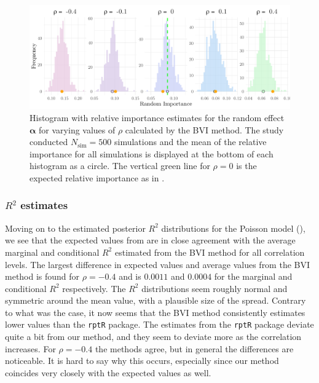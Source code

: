 \begin{figure}[H]
  \centering
    \includegraphics[width=1\linewidth]{Figures/Simulation study/Random_poisson.png}
    \caption[Relative importance of the random effect $\boldsymbol{\alpha}$ in Poisson GLMM]{Histogram with relative importance estimates for the random effect $\boldsymbol{\alpha}$ for varying values of $\rho$ calculated by the BVI method. The study conducted $N_{\text{sim}}=500$ simulations and the mean of the relative importance for all simulations is displayed at the bottom of each histogram as a circle. The vertical green line for $\rho=0$ is the expected relative importance as in .}
    \label{fig:relimp_random_poisson}
\end{figure}
\subsubsection{$R^2$ estimates}
Moving on to the estimated posterior $R^2$ distributions for the Poisson model (), we see that the expected values from  are in close agreement with the average marginal and conditional $R^2$ estimated from the BVI method for all correlation levels. The largest difference in expected values and average values from the BVI method is found for $\rho=-0.4$ and is $0.0011$ and $0.0004$ for the marginal and conditional $R^2$ respectively. The $R^2$ distributions seem roughly normal and symmetric around the mean value, with a plausible size of the spread. Contrary to what was the case, it now seems that the BVI method consistently estimates lower values than the \texttt{rptR} package. The estimates from the \texttt{rptR} package deviate quite a bit from our method, and they seem to deviate more as the correlation increases. For $\rho=-0.4$ the methods agree, but in general the differences are noticeable. It is hard to say why this occurs, especially since our method coincides very closely with the expected values as well.

